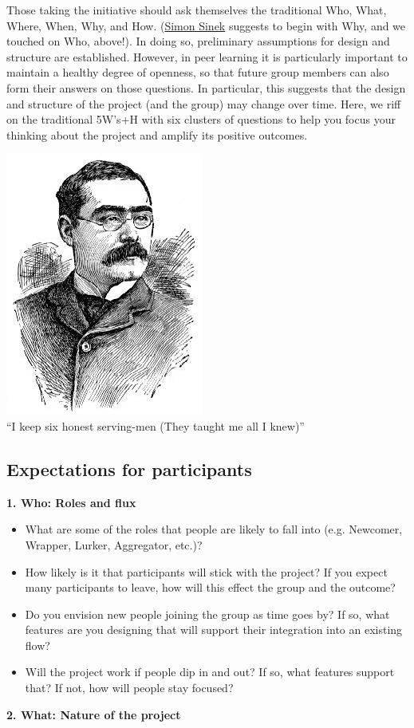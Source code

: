 Those taking the initiative should ask themselves the traditional Who,
What, Where, When, Why, and How.
(\href{http://en.wikipedia.org/wiki/Simon\_Sinek}{Simon Sinek} suggests
to begin with Why, and we touched on Who, above!). In doing so,
preliminary assumptions for design and structure are established.
However, in peer learning it is particularly important to maintain a
healthy degree of openness, so that future group members can also form
their answers on those questions. In particular, this suggests that the
design and structure of the project (and the group) may change over
time. Here, we riff on the traditional 5W's+H with six clusters of
questions to help you focus your thinking about the project and amplify
its positive outcomes.

\begin{center}
\includegraphics[width=.5\textwidth]{../pictures/kipling.jpg} \\
``I keep six honest serving-men (They taught me all I knew)''
\end{center}

\subsection{Expectations for participants}

\textbf{1. Who: Roles and flux}

\begin{itemize}
\item
  What are some of the roles that people are likely to fall into (e.g.
  Newcomer, Wrapper, Lurker, Aggregator, etc.)?
\item
  How likely is it that participants will stick with the project? If you
  expect many participants to leave, how will this effect the group and
  the outcome?
\item
  Do you envision new people joining the group as time goes by? If so,
  what features are you designing that will support their integration
  into an existing flow?
\item
  Will the project work if people dip in and out? If so, what features
  support that? If not, how will people stay focused?
\end{itemize}
\textbf{2. What: Nature of the project}

